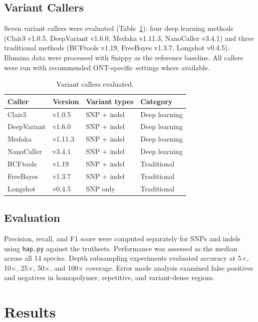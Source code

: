 \documentclass[11pt]{article}
\begin{document}
\subsection{Variant Callers}

Seven variant callers were evaluated (Table~\ref{tab:callers}): four deep learning methods (Clair3 v1.0.5, DeepVariant v1.6.0, Medaka v1.11.3, NanoCaller v3.4.1) and three traditional methods (BCFtools v1.19, FreeBayes v1.3.7, Longshot v0.4.5). Illumina data were processed with Snippy as the reference baseline. All callers were run with recommended ONT-specific settings where available.

\begin{table}[h]
\centering
\caption{Variant callers evaluated.}
\label{tab:callers}
\begin{tabular}{llll}
\toprule
Caller & Version & Variant types & Category \\
\midrule
Clair3 & v1.0.5 & SNP + indel & Deep learning \\
DeepVariant & v1.6.0 & SNP + indel & Deep learning \\
Medaka & v1.11.3 & SNP + indel & Deep learning \\
NanoCaller & v3.4.1 & SNP + indel & Deep learning \\
BCFtools & v1.19 & SNP + indel & Traditional \\
FreeBayes & v1.3.7 & SNP + indel & Traditional \\
Longshot & v0.4.5 & SNP only & Traditional \\
\bottomrule
\end{tabular}
\end{table}

\subsection{Evaluation}

Precision, recall, and F1 score were computed separately for SNPs and indels using \texttt{hap.py} against the truthsets. Performance was assessed as the median across all 14 species. Depth subsampling experiments evaluated accuracy at 5$\times$, 10$\times$, 25$\times$, 50$\times$, and 100$\times$ coverage. Error mode analysis examined false positives and negatives in homopolymer, repetitive, and variant-dense regions.

\section{Results}
\end{document}
